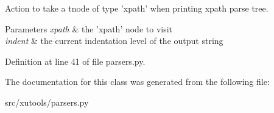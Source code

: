 Action to take a tnode of type 'xpath' when printing xpath parse tree. 


\begin{DoxyParams}{Parameters}
{\em xpath} & the 'xpath' node to visit \\
\hline
{\em indent} & the current indentation level of the output string \\
\hline
\end{DoxyParams}


Definition at line 41 of file parsers.\-py.



The documentation for this class was generated from the following file\-:\begin{DoxyCompactItemize}
\item 
src/xutools/parsers.\-py\end{DoxyCompactItemize}
